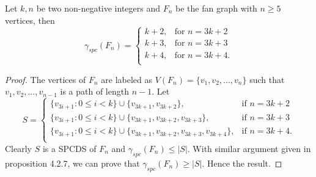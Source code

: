 \begin{proposition}
Let $k,n$ be two non-negative integers and $F_n$ be the fan graph with $n \geq 5$ vertices, then 
\[
\gamma_{spc}(F_n) = \begin{cases}
k+2, & \text{for }n=3k+2 \\
k+3, & \text{for }n=3k+3 \\
k+4, & \text{for }n=3k+4. \\
\end{cases} 
\]
\end{proposition}
\begin{proof}
The vertices of $F_n$ are labeled as $V(F_n)= \{ v_1, v_2,...,v_n\}$ such that $v_1, v_2,...,v_{n-1}$ is a path of length $n-1$.  Let
\[
S = \begin{cases}
\lbrace v_{3i+1}:0\leq i < k \rbrace \cup \lbrace v_{3k+1},v_{3k+2} \rbrace, & \text{if }n=3k+2 \\
\lbrace v_{3i+1}:0\leq i < k \rbrace \cup \lbrace v_{3k+1},v_{3k+2},v_{3k+3} \rbrace, & \text{if }n=3k+3 \\
\lbrace v_{3i+1}:0\leq i < k \rbrace \cup \lbrace v_{3k+1},v_{3k+2},v_{3k+3},v_{3k+4} \rbrace, & \text{if }n=3k+4. \\
\end{cases} 
\]
Clearly $S$ is a SPCDS of $F_n$ and $\gamma_{spc}(F_n) \leq |S|$. With similar argument given in proposition 4.2.7, we can prove that $\gamma_{spc}(F_n) \geq |S|$. Hence the result.
\end{proof}
